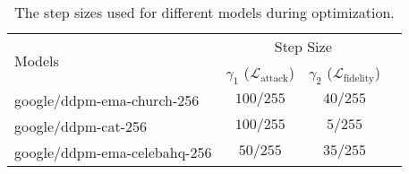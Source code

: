 \begin{table}[h]
\footnotesize{
    \centering
    \begin{tabular}{lccc}
        \toprule
        \multirow{2}{*}{Models} & \multicolumn{2}{c}{Step Size} \\ 
         &  $\gamma_1$ ($\mathcal{L}_\text{attack}$)  & $\gamma_2$ ($\mathcal{L}_\text{fidelity}$)   \\
        \midrule
        google/ddpm-ema-church-256 & $100/255$ & $40/255$ \\
        google/ddpm-cat-256 & $100/255$ & $5/255$ \\
        google/ddpm-ema-celebahq-256 & $50/255$ & $35/255$ \\  
        
        \bottomrule
    \end{tabular}
    \caption{The step sizes used for different models during optimization.} 
\label{tab:step_size}
}
\end{table}